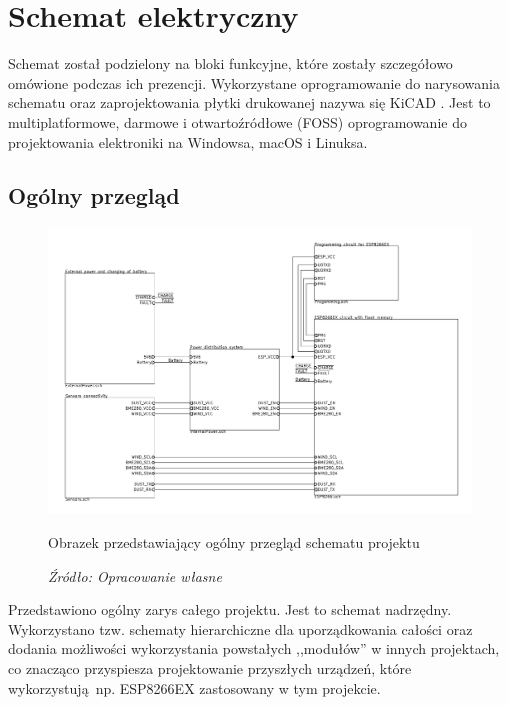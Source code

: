 \documentclass[12pt,a4paper,oneside]{memoir}
\begin{document}
\chapter{Schemat elektryczny}
\par Schemat został podzielony na bloki funkcyjne, które zostały szczegółowo omówione podczas ich prezencji. Wykorzystane oprogramowanie do narysowania schematu oraz zaprojektowania płytki drukowanej nazywa się KiCAD \cite{kicad}. Jest to multiplatformowe, darmowe i otwartoźródłowe (FOSS) oprogramowanie do projektowania elektroniki na Windowsa, macOS i Linuksa.
\section{Ogólny przegląd}
\begin{figure}[!h]
	\centering
	\includegraphics[scale=0.15]{images/sch/sch-01.png}
	{\tytulyrozdzialow \footnotesize \caption[Schemat - ogólny przegląd] {Obrazek przedstawiający ogólny przegląd schematu projektu}}
	\caption*{\textit{Źródło: Opracowanie własne}}
\end{figure}
\par Przedstawiono ogólny zarys całego projektu. Jest to schemat nadrzędny. Wykorzystano tzw. schematy hierarchiczne dla uporządkowania całości oraz dodania możliwości wykorzystania powstałych ,,modułów'' w innych projektach, co znacząco przyspiesza projektowanie przyszłych urządzeń, które wykorzystują np. ESP8266EX zastosowany w tym projekcie.
\newpage
\end{document}
